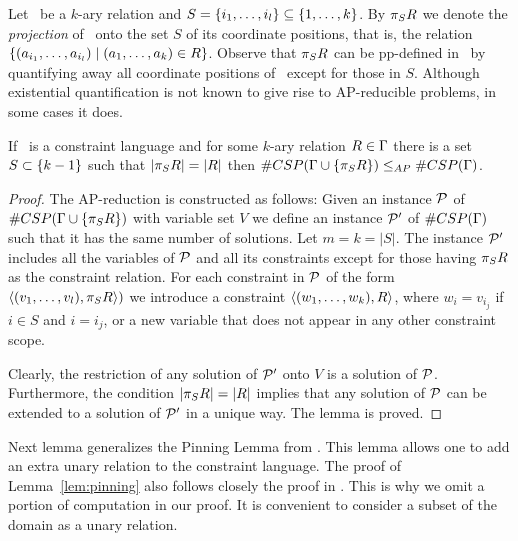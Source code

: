 Let \mR\ be a \(k\)-ary relation and \(S=\{{i_1,\dotsc,i_l}\} \subseteq \{{1,\dotsc,k}\}\)\@.
By \(\pi_{S}{R}\) we denote the \emph{projection} of \mR\ onto the set \(S\) of its coordinate
positions, that is, the relation \(\{{(a_{i_1},\dotsc,a_{i_l}) \mid (a_1,\dotsc,a_k)\in R}\}\)\@.
Observe that \(\pi_{S}{R}\) can be pp-defined in \mR\ by quantifying away all coordinate positions of
\mR\ except for those in \(S\)\@.
Although existential quantification is not known to give rise to AP-reducible problems, in some
cases it does.

\begin{lemma}\label{lem:projection}
If \mrelset\ is a constraint language and for some \(k\)-ary relation \(R\in\Gamma\)
there is a set \(S\subset \{{k-1}\}\) such that \(|\pi_{S}{R}|=|R|\) then 
\(\#CSP(\Gamma \cup \{{\pi_{S}{R}}\}) \le_{AP} \#CSP(\Gamma)\).
\end{lemma}

\begin{proof}
The AP-reduction is constructed as follows: Given an instance \(\mathcal{P}\)
of \(\#CSP(\Gamma\cup \{\pi_{S}{R}\})\) with variable set \(V\) we define an 
instance \(\mathcal{P}'\) of \(\#CSP(\Gamma)\) such that it has the same number of solutions.
Let \(m=k=|S|\)\@. The instance \(\mathcal{P}'\) includes all the variables of \(\mathcal{P}\)
and all its constraints except for those having \(\pi_{S}{R}\) as the constraint relation. For each
constraint in \(\mathcal{P}\) of the form \(\langle (v_1,\dotsc,v_l),\pi_{S}{R} \rangle)\)
we introduce a constraint \(\langle (w_1,\dotsc,w_k),R \rangle\), where 
\(w_i=v_{i_j}\) if \(i\in S\) and \(i=i_j\), or a new variable that does not appear in any other constraint scope. 

Clearly, the restriction of any solution of \(\mathcal{P}'\) onto \(V\) is a solution of \(\mathcal{P}\)\@.
Furthermore, the condition \(|\pi_{S}{R}|=|R|\) implies that any solution of \(\mathcal{P}\)
can be extended to a solution of \(\mathcal{P}'\) in a unique way. The lemma is proved.
\end{proof}


Next lemma generalizes the Pinning Lemma from
\cite{Trichotomy}. This lemma allows one to add an extra unary relation to the constraint language.
The proof of Lemma~\ref{lem:pinning} also follows closely the proof in \cite{Trichotomy}. 
This is why we omit a portion of computation in our proof. It is convenient to consider a subset of the domain as a unary relation.

